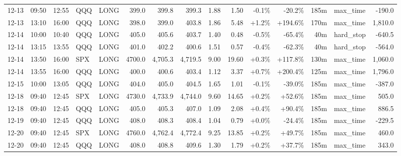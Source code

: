 \documentclass[11pt,a4paper,twoside]{article}
\begin{document}
\begin{landscape}
\begin{center}
\begin{longtable}{>{\color{txtmain}}l l l l l r r r r r r r r >{\color{txtmain}}l r}
12-13 & 09:50 & 12:55 & QQQ & LONG & 399.0 & 399.8 & 399.3 & 1.88 & 1.50 & \textcolor{lossred}{-0.1\%} & \textcolor{lossred}{-20.2\%} & 185m & max\_time & \textcolor{lossred}{-190.0} \\
12-13 & 13:10 & 16:00 & QQQ & LONG & 398.0 & 399.0 & 403.8 & 1.86 & 5.48 & \textcolor{wingreen}{+1.2\%} & \textcolor{wingreen}{+194.6\%} & 170m & max\_time & \textcolor{wingreen}{1,810.0} \\
12-14 & 10:00 & 10:40 & QQQ & LONG & 405.0 & 405.6 & 403.7 & 1.40 & 0.48 & \textcolor{lossred}{-0.5\%} & \textcolor{lossred}{-65.4\%} & 40m & hard\_stop & \textcolor{lossred}{-640.5} \\
12-14 & 13:15 & 13:55 & QQQ & LONG & 401.0 & 402.2 & 400.6 & 1.51 & 0.57 & \textcolor{lossred}{-0.4\%} & \textcolor{lossred}{-62.3\%} & 40m & hard\_stop & \textcolor{lossred}{-564.0} \\
12-14 & 13:50 & 16:00 & SPX & LONG & 4700.0 & 4,705.3 & 4,719.5 & 9.00 & 19.60 & \textcolor{wingreen}{+0.3\%} & \textcolor{wingreen}{+117.8\%} & 130m & max\_time & \textcolor{wingreen}{1,060.0} \\
12-14 & 13:55 & 16:00 & QQQ & LONG & 400.0 & 400.6 & 403.4 & 1.12 & 3.37 & \textcolor{wingreen}{+0.7\%} & \textcolor{wingreen}{+200.4\%} & 125m & max\_time & \textcolor{wingreen}{1,796.0} \\
12-15 & 10:00 & 13:05 & QQQ & LONG & 404.0 & 405.0 & 404.5 & 1.65 & 1.01 & \textcolor{lossred}{-0.1\%} & \textcolor{lossred}{-39.0\%} & 185m & max\_time & \textcolor{lossred}{-387.0} \\
12-18 & 09:40 & 12:45 & SPX & LONG & 4730.0 & 4,733.9 & 4,744.0 & 9.60 & 14.65 & \textcolor{wingreen}{+0.2\%} & \textcolor{wingreen}{+52.6\%} & 185m & max\_time & \textcolor{wingreen}{505.0} \\
12-18 & 09:40 & 12:45 & QQQ & LONG & 405.0 & 405.3 & 407.0 & 1.09 & 2.08 & \textcolor{wingreen}{+0.4\%} & \textcolor{wingreen}{+90.4\%} & 185m & max\_time & \textcolor{wingreen}{886.5} \\
12-19 & 09:40 & 12:45 & QQQ & LONG & 408.0 & 408.3 & 408.4 & 1.04 & 0.79 & \textcolor{wingreen}{+0.0\%} & \textcolor{lossred}{-24.4\%} & 185m & max\_time & \textcolor{lossred}{-229.5} \\
12-20 & 09:40 & 12:45 & SPX & LONG & 4760.0 & 4,762.4 & 4,772.4 & 9.25 & 13.85 & \textcolor{wingreen}{+0.2\%} & \textcolor{wingreen}{+49.7\%} & 185m & max\_time & \textcolor{wingreen}{460.0} \\
12-20 & 09:40 & 12:45 & QQQ & LONG & 408.0 & 408.8 & 409.6 & 1.30 & 1.79 & \textcolor{wingreen}{+0.2\%} & \textcolor{wingreen}{+37.7\%} & 185m & max\_time & \textcolor{wingreen}{343.0} \\

\end{longtable}
\end{center}
\end{landscape}
\end{document}

